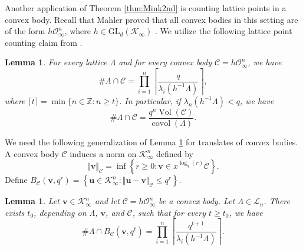 \documentclass[11pt,a4paper,reqno]{amsart}
\newcommand{\GL}{\mathrm{GL}}
\newtheorem{lemma}[theorem]{Lemma}
\theoremstyle{definition}
\theoremstyle{remark}
\numberwithin{equation}{section}
\begin{document}
Another application of Theorem \ref{thm:Mink2nd} is counting lattice points in a convex body. Recall that Mahler proved that all convex bodies in this setting are of the form $h\mathcal{O}_{\infty}^n$, where $h\in \GL_d(\mathcal K_\infty)$ \cite{Mah}. We utilize the following lattice point counting claim from \cite{BK}.
\begin{lemma}{\cite[Lemma 6.2]{BK}}
\label{lem:BK}
    For every lattice $\Lambda$ and for every convex body $\mathcal{C}=h\mathcal{O}_{\infty}^n$, we have
    $$\#\Lambda\cap \mathcal{C}=\prod_{i=1}^n\left\lceil \frac{q}{\lambda_i(h^{-1}\Lambda)}\right\rceil,$$
    where $\lceil t\rceil=\min\{n\in \mathbb{Z}:n\geq t\}$. In particular, if $\lambda_{n}(h^{-1}\Lambda)<q$, we have
    $$\#\Lambda\cap \mathcal{C}=\frac{q^n\operatorname{Vol}(\mathcal{C})}{\operatorname{covol}(\Lambda)}.$$
\end{lemma}
We need the following generalization of Lemma \ref{lem:BK} for translates of convex bodies. A convex body $\mathcal{C}$ induces a norm on $\mathcal{K}_{\infty}^n$ defined by
$$\Vert \mathbf{v}\Vert_{\mathcal{C}}=\inf\left\{r\geq 0:\mathbf{v}\in x^{\log_q(r)}\mathcal{C}\right\}.$$
Define $B_{\mathcal{C}}(\mathbf{v},q^r)=\left\{\mathbf{u}\in \mathcal{K}_{\infty}^n:\Vert \mathbf{u}-\mathbf{v}\Vert_{\mathcal{C}}\leq q^r\right\}.$
\begin{lemma}
    Let $\mathbf{v}\in \mathcal{K}_{\infty}^n$ and let $\mathcal{C}=h\mathcal{O}_{\infty}^n$ be a convex body. Let $\Lambda\in \mathcal{L}_n$. There exists $t_0$, depending on $\Lambda$, $\mathbf{v}$, and $\mathcal{C}$, such that for every $t\geq t_0$, we have 
    $$\#\Lambda\cap B_{\mathcal{C}}(\mathbf{v},q^t)=\prod_{i=1}^n\left\lceil\frac{q^{t+1}}{\lambda_i(h^{-1}\Lambda)}\right\rceil.$$
\end{lemma}
\end{document}
